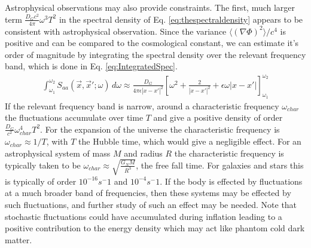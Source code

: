 \documentclass[aps,preprintnumbers,superscriptaddress,longbibliography]{revtex4-1}
\begin{document}
Astrophysical observations may also provide constraints. The first, much larger term $\frac{D_Gc^2}{4\pi}{\omega^3 T^2}$ in the spectral density of Eq. \eqref{eq:thespectraldensity} appears to be consistent with astrophysical observation. Since the variance $\langle(\nabla\Phi)^2\rangle/c^4$ is positive and can be compared to the cosmological constant, we can estimate it's order of magnitude by integrating the spectral density over the relevant frequency band, which is done in Eq. \eqref{eq:IntegratedSpec}. 
\begin{align}
\int^{\omega_2}_{\omega_1} S_{aa}(\vec{x}, \vec{x}'; \omega) \, d\omega \approx \frac{D_G}{4\pi \epsilon |x-x'|^2} \left[ \omega^2 + \frac{2}{|x-x'|^2}  + \epsilon \omega |x-x'| \right]^{\omega_2}_{\omega_1}
\label{eq:IntegratedSpec_main}
\end{align}
If the relevant frequency band is narrow, around a characteristic frequency $\omega_{char}$  the fluctuations accumulate over time $T$ and give a positive density of order $\frac{D_G}{c^2}\omega_{char}^4 T^2$. For the expansion of the universe  the characteristic frequency is $\omega_{char}\approx  1/T$, with $T$ the Hubble time, which would give a negligible effect. For an astrophysical system of mass $M$ and radius $R$ the characteristic frequency is typically taken to be $\omega_{char}\approx \sqrt{\frac{G_NM}{R^3}}$, the free fall time. For galaxies and stars this is typically of order $10^{-16}\unit{s^-1}$ and $10^{-4}\unit{s^-1}$. If the body is effected by fluctuations at a much broader band of frequencies, then these systems may be effected by such fluctuations, and further study of such an effect may be needed. Note that stochastic fluctuations could have accumulated during inflation leading to a positive contribution to the energy density which may act like phantom cold dark matter\cite{oppenheim2024emergence}.









\end{document}
